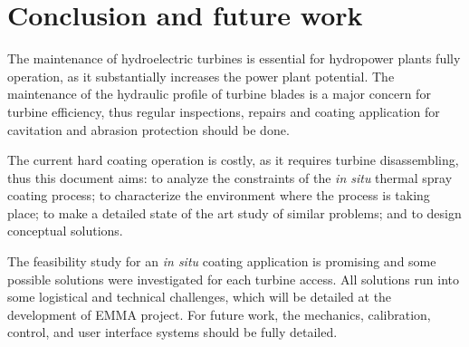 \section{Conclusion and future work}\label{sec:conclusions}
The maintenance of hydroelectric turbines is essential for hydropower plants
fully operation, as it substantially increases the power plant potential. The
maintenance of the hydraulic profile of turbine blades is a major concern for
turbine efficiency, thus regular inspections, repairs and coating application
for cavitation and abrasion protection should be done.

The current hard coating operation is costly, as it requires turbine
disassembling, thus this document aims: to analyze the constraints of the
\textit{in situ} thermal spray coating process; to characterize the environment
where the process is taking place; to make a detailed state of the art study
of similar problems; and to design conceptual solutions.


The feasibility study for an \textit{in situ} coating application is promising
and some possible solutions were investigated for each turbine access. All
solutions run into some logistical and technical challenges, which will be
detailed at the development of EMMA project. For future work, the
mechanics, calibration, control, and user interface systems should be fully
detailed.

